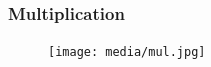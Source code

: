 \begin{frame}
    \frametitle{Multiplication}
    \begin{figure}[tp]
    \texttt{[image: media/mul.jpg]}
    \end{figure}
\end{frame}

    
